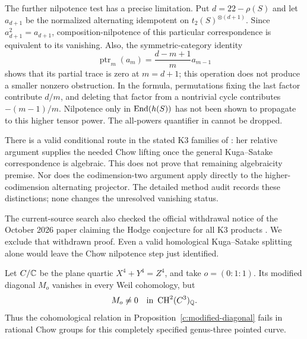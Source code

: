 The further nilpotence test has a precise limitation.  Put
$d=22-\rho(S)$ and let $a_{d+1}$ be the normalized alternating
idempotent on $t_2(S)^{\otimes(d+1)}$.  Since $a_{d+1}^2=a_{d+1}$,
composition-nilpotence of this particular correspondence is equivalent
to its vanishing.  Also, the symmetric-category identity
\[
 \operatorname{ptr}_{m}(a_m)=\frac{d-m+1}{m}a_{m-1}
\]
shows that its partial trace is zero at $m=d+1$; this operation does
not produce a smaller nonzero obstruction.  In the formula, permutations
fixing the last factor contribute $d/m$, and deleting that factor from
a nontrivial cycle contributes $-(m-1)/m$.  Nilpotence only in
$\operatorname{End}(h(S))$ has not been shown to propagate to this higher tensor
power.  The all-powers quantifier in
\citet[Theorem~0.2, author p.~2]{c_jannsen2006finite} cannot be dropped.

There is a valid conditional route in the stated K3 families of
\citet[Theorems~3.5--3.6, with Proposition~1.3]{c_voisin2014bloch}:
her relative argument supplies the needed Chow lifting once the general
Kuga--Satake correspondence is algebraic.  This does not prove that
remaining algebraicity premise.  Nor does the codimension-two argument
apply directly to the higher-codimension alternating projector.
The detailed method audit records these distinctions; none changes the
unresolved vanishing status.

The current-source search also checked the official withdrawal notice of the October 2026 paper claiming the Hodge conjecture for all K3 products \citep{c_k3withdrawal2026}. We exclude that withdrawn proof. Even a valid homological Kuga--Satake splitting alone would leave the Chow nilpotence step just identified.

\begin{example}
\label{c:fermat-counterexample}
Let $C/\mathbb C$ be the plane quartic $X^4+Y^4=Z^4$, and take $o=(0:1:1)$. Its modified diagonal $M_o$ vanishes in every Weil cohomology, but
\[
 M_o\ne0\quad\hbox{in }\operatorname{CH}^2(C^3)_\mathbb Q.
\]
Thus the cohomological relation in Proposition~\ref{c:modified-diagonal} fails in rational Chow groups for this completely specified genus-three pointed curve.
\end{example}

